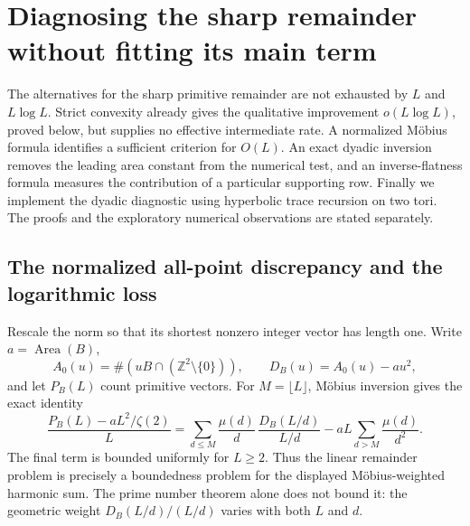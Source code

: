\section{Diagnosing the sharp remainder without fitting its main term}
\label{sec:sharpdiagnostics}

The alternatives for the sharp primitive remainder are not exhausted by
$L$ and $L\log L$. Strict convexity already gives the qualitative
improvement $o(L\log L)$, proved below, but supplies no effective
intermediate rate. A normalized M\"obius formula identifies a sufficient
criterion for $O(L)$. An exact dyadic inversion removes the leading area
constant from the numerical test, and an inverse-flatness formula measures
the contribution of a particular supporting row. Finally we implement the
dyadic diagnostic using hyperbolic trace recursion on two tori.
The proofs and the exploratory numerical observations are stated separately.

\subsection{The normalized all-point discrepancy and the logarithmic loss}
\label{subsec:mobiusmodulus}

Rescale the norm so that its shortest nonzero integer vector has length one.
Write $a=\operatorname{Area}(B)$,
\[
 A_0(u)=\#(uB\cap(\mathbb Z^2\setminus\{0\})),\qquad
 D_B(u)=A_0(u)-a u^2,
\]
and let $P_B(L)$ count primitive vectors. For $M=\lfloor L\rfloor$,
M\"obius inversion gives the exact identity
\begin{equation}
 \frac{P_B(L)-aL^2/\zeta(2)}{L}
 =\sum_{d\le M}\frac{\mu(d)}d\,
       \frac{D_B(L/d)}{L/d}
   -aL\sum_{d>M}\frac{\mu(d)}{d^2}.
 \label{eq:primitiveexactnormalizedmobius}
\end{equation}
The final term is bounded uniformly for $L\ge2$. Thus the linear
remainder problem is precisely a boundedness problem for the displayed
M\"obius-weighted harmonic sum. The prime number theorem alone does not
bound it: the geometric weight $D_B(L/d)/(L/d)$ varies with both $L$ and $d$.

